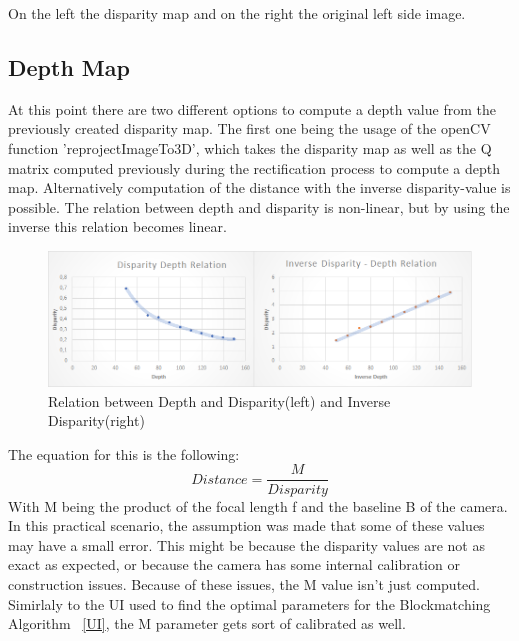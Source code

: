 \documentclass[journal,onecolumn]{IEEEtran}
\begin{document}
\noindent On the left the disparity map and on the right the original left side image.

\subsection{Depth Map}
\noindent
\noindent At this point there are two different options to compute a depth value from the previously created disparity map. The first one being the usage of the openCV function 'reprojectImageTo3D', which takes the disparity map as well as the Q matrix computed  previously during the rectification process to compute a depth map.
Alternatively computation of the distance with the inverse disparity-value is possible. The relation between depth and disparity is non-linear, but by using the inverse this relation becomes linear. 
\begin{figure}[H]
	\centering
	\includegraphics[scale=0.5]{ratios.png}
	\captionsetup{justification=centering}
	\caption{Relation between Depth and Disparity(left) and Inverse Disparity(right)}
\end{figure}
\noindent The equation for this is the following: 
\begin{equation}
	Distance = \frac{M}{Disparity}
\end{equation}
\noindent With M being the product of the focal length f and the baseline B of the camera. \newline
In this practical scenario, the assumption was made that some of these values may have a small error. This might be because the disparity values are not as exact as expected, or because the camera has some internal calibration or construction issues. Because of these issues, the  M value isn't just computed. Simirlaly to the UI used to find the optimal parameters for the Blockmatching Algorithm ~\ref{UI}, the M parameter gets sort of calibrated as well. 
\end{document}
